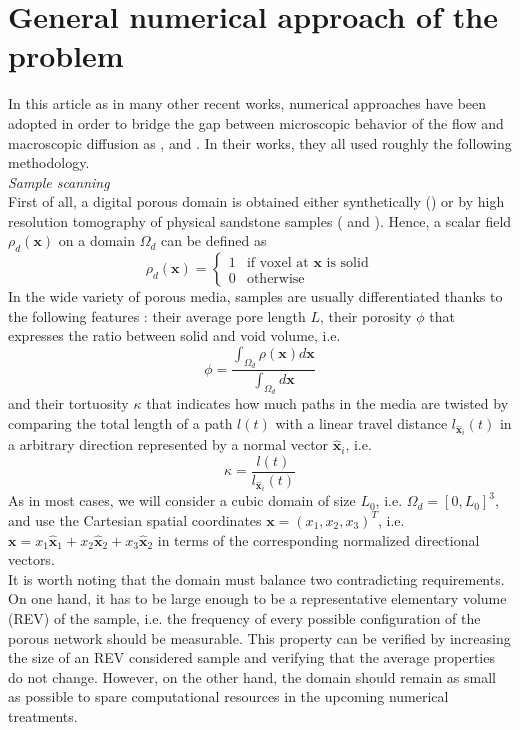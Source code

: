 \section{General numerical approach of the problem}
In this article as in many other recent works, numerical approaches have been adopted in order to bridge the gap between microscopic behavior of the flow and macroscopic diffusion as \citet{Meyer2016}, \citet{Dentz2017} and \citet{Puyguiraud2019}. In their works, they all used roughly the following methodology.\\
\textit{Sample scanning}\\
First of all, a digital porous domain is obtained either synthetically (\cite{Dentz2017}) or by high resolution tomography of physical sandstone samples (\cite{Meyer2016} and \cite{Puyguiraud2019}).
Hence, a scalar field  $\rho_d(\textbf{x})$ on a domain $\Omega_d$ can be defined as 
\[
\rho_d(\textbf{x})=\left\{
\begin{array}{ll}
1 &  \textrm{if voxel at $\textbf{x}$ is solid} \\
0 & \textrm{otherwise}
\end{array} 
\right.
\]
In the wide variety of porous media, samples are usually differentiated thanks to the following features : their average pore length $L$, their porosity $\phi$ that expresses the ratio between solid and void volume, i.e.
\[
\phi = \frac{\int_{\Omega_d}\rho(\textbf{x})d\textbf{x}}{\int_{\Omega_d}d\textbf{x}}
\] 
and their tortuosity $\kappa$ that indicates how much paths in the media are twisted by comparing the total length of a path $l(t)$ with a linear travel distance $l_{\hat{\textbf{x}}_i}(t)$ in a arbitrary direction represented by a normal vector $\hat{\textbf{x}}_i$, i.e. 
\[
\kappa = \frac{l(t)}{l_{\hat{\textbf{x}}_i}(t)}
\] 
As in most cases, we will consider a cubic domain of size $L_0$, i.e. $\Omega_d=[0,L_0]^3$, and use the Cartesian spatial coordinates $\textbf{x}=(x_1,x_2,x_3)^T$, i.e. $\textbf{x}=x_1\hat{\textbf{x}}_1+x_2\hat{\textbf{x}}_2+x_3\hat{\textbf{x}}_2$ in terms of the corresponding normalized directional vectors.\\
It is worth noting that the domain must balance two contradicting requirements. On one hand, it has to be large enough to be a representative elementary volume (REV) of the sample, i.e. the frequency of every possible configuration of the porous network should be measurable.
This property can be verified by increasing the size of an REV considered sample and verifying that the average properties do not change.
However, on the other hand, the domain should remain as small as possible to spare computational resources in the upcoming numerical treatments.\\
